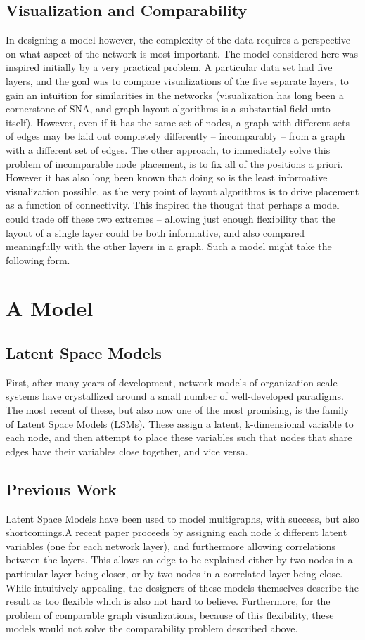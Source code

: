 \documentclass[11pt]{scrartcl}
\begin{document}
\subsection{Visualization and Comparability}
In designing a model however, the complexity of the data requires a perspective on what aspect of the network is most important. The model considered here was inspired initially by a very practical problem. A particular data set had five layers, and the goal was to compare visualizations of the five separate layers, to gain an intuition for similarities in the networks (visualization has long been a cornerstone of SNA, and graph layout algorithms is a substantial field unto itself). However, even if it has the same set of nodes, a graph with different sets of edges may be laid out completely differently -- incomparably -- from a graph with a different set of edges. The other approach, to immediately solve this problem of incomparable node placement, is to fix all of the positions a priori. However it has also long been known that doing so is the least informative visualization possible, as the very point of layout algorithms is to drive placement as a function of connectivity. This inspired the thought that perhaps a model could trade off these two extremes -- allowing just enough flexibility that the layout of a single layer could be both informative, and also compared meaningfully with the other layers in a graph. Such a model might take the following form.

\section{A Model}
\subsection{Latent Space Models}
First, after many years of development, network models of organization-scale systems have crystallized around a small number of well-developed paradigms. The most recent of these, but also now one of the most promising, is the family of Latent Space Models (LSMs). These assign a latent, k-dimensional variable to each node, and then attempt to place these variables such that nodes that share edges have their variables close together, and vice versa. 

\subsection{Previous Work}
Latent Space Models have been used to model multigraphs, with success, but also shortcomings.A recent paper proceeds by assigning each node k different latent variables (one for each network layer), and furthermore allowing correlations between the layers. This allows an edge to be explained either by two nodes in a particular layer being closer, or by two nodes in a correlated layer being close. While intuitively appealing, the designers of these models themselves describe the result as too flexible which is also not hard to believe. Furthermore, for the problem of comparable graph visualizations, because of this flexibility, these models would not solve the comparability problem described above.
\end{document}
